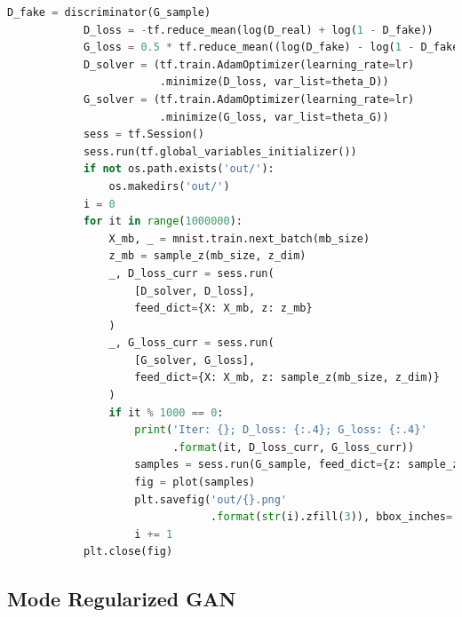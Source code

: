\begin{lstlisting}[language = Python]
            D_fake = discriminator(G_sample)
            D_loss = -tf.reduce_mean(log(D_real) + log(1 - D_fake))
            G_loss = 0.5 * tf.reduce_mean((log(D_fake) - log(1 - D_fake))**2)
            D_solver = (tf.train.AdamOptimizer(learning_rate=lr)
                        .minimize(D_loss, var_list=theta_D))
            G_solver = (tf.train.AdamOptimizer(learning_rate=lr)
                        .minimize(G_loss, var_list=theta_G))
            sess = tf.Session()
            sess.run(tf.global_variables_initializer())
            if not os.path.exists('out/'):
                os.makedirs('out/')
            i = 0
            for it in range(1000000):
                X_mb, _ = mnist.train.next_batch(mb_size)
                z_mb = sample_z(mb_size, z_dim)
                _, D_loss_curr = sess.run(
                    [D_solver, D_loss],
                    feed_dict={X: X_mb, z: z_mb}
                )
                _, G_loss_curr = sess.run(
                    [G_solver, G_loss],
                    feed_dict={X: X_mb, z: sample_z(mb_size, z_dim)}
                )
                if it % 1000 == 0:
                    print('Iter: {}; D_loss: {:.4}; G_loss: {:.4}'
                          .format(it, D_loss_curr, G_loss_curr))
                    samples = sess.run(G_sample, feed_dict={z: sample_z(16, z_dim)})
                    fig = plot(samples)
                    plt.savefig('out/{}.png'
                                .format(str(i).zfill(3)), bbox_inches='tight')
                    i += 1
            plt.close(fig)
            \end{lstlisting}

    \subsection{Mode Regularized GAN}
